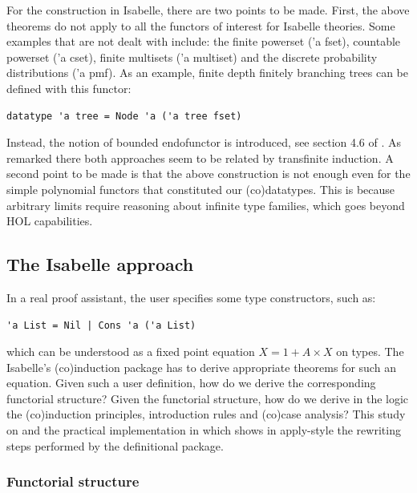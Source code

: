\documentclass[notitlepage]{article}
\begin{document}
For the construction in Isabelle, there are two points to be made. First, the above theorems do not apply to all the functors of interest for Isabelle theories. Some examples that are not dealt with include: the finite powerset ('a fset), countable powerset ('a cset), finite multisets ('a multiset) and the discrete probability distributions ('a pmf). As an example, finite depth finitely branching trees can be defined with this functor:

\begin{lstlisting}
datatype 'a tree = Node 'a ('a tree fset)
\end{lstlisting}

Instead, the notion of bounded endofunctor is introduced, see section 4.6 of \cite{jacobs2005introduction}. As remarked there both approaches seem to be related by transfinite induction. A second point to be made is that the above construction is not enough even for the simple polynomial functors that constituted our (co)datatypes. This is because arbitrary limits require reasoning about infinite type families, which goes beyond HOL capabilities.

\subsection{The Isabelle approach}

In a real proof assistant, the user specifies some type constructors, such as:

\begin{lstlisting}
'a List = Nil | Cons 'a ('a List) 
\end{lstlisting}

which can be understood as a fixed point equation $X = 1 + A \times X$ on types. The Isabelle's (co)induction package has to derive appropriate theorems for such an equation. Given such a user definition, how do we derive the corresponding functorial structure? Given the functorial structure, how do we derive in the logic the (co)induction principles, introduction rules and (co)case analysis? This study on \cite{traytel} and the practical implementation in \cite{boundednat} which shows in apply-style the rewriting steps performed by the definitional package. 


\subsubsection{Functorial structure}
\end{document}
